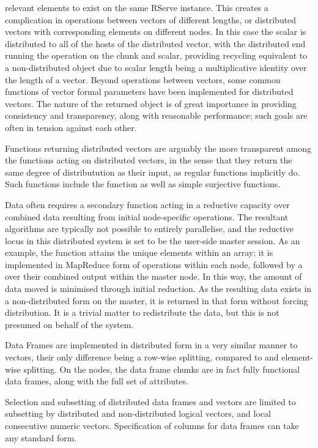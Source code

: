 relevant elements to exist on the same RServe instance. This creates a
complication in operations between vectors of different lengths, or
distributed vectors with corresponding elements on different nodes. In
this case the scalar is distributed to all of the hosts of the
distributed vector, with the distributed end running the operation on
the chunk and scalar, providing recycling equivalent to a
non-distributed object due to scalar length being a multiplicative
identity over the length of a vector. Beyond operations between vectors,
some common functions of vector formal parameters have been implemented
for distributed vectors. The nature of the returned object is of great
importance in providing consistency and transparency, along with
reasonable performance; such goals are often in tension against each
other.

Functions returning distributed vectors are arguably the more
transparent among the functions acting on distributed vectors, in the
sense that they return the same degree of distributution as their input,
as regular \R{} functions implicitly do. Such functions include the
 function as well as simple surjective functions.

Data often requires a secondary function acting in a reductive capacity
over combined data resulting from initial node-specific operations. The
resultant algorithms are typically not possible to entirely parallelise,
and the reductive locus in this distributed system is set to be the
user-side master \R{} session. As an example, the  function
attains the unique elements within an array; it is implemented in
MapReduce form of  operations within each node, followed
by a  over their combined output within the master node.
In this way, the amount of data moved is minimised through initial
reduction. As the resulting data exists in a non-distributed form on the
master, it is returned in that form without forcing distribution. It is
a trivial matter to redistribute the data, but this is not presumed on
behalf of the system.

Data Frames are implemented in distributed form in a very similar manner
to vectors, their only difference being a row-wise splitting, compared
to and element-wise splitting. On the nodes, the data frame chunks are
in fact fully functional data frames, along with the full set of
attributes.

Selection and subsetting of distributed data frames and vectors are
limited to subsetting by distributed and non-distributed logical
vectors, and local consecutive numeric vectors. Specification of columns
for data frames can take any standard form.

